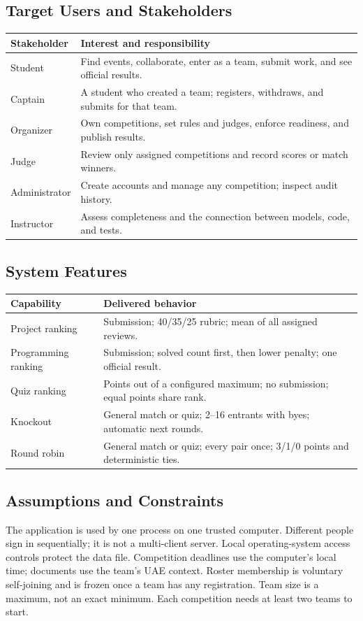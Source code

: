 \documentclass[12pt]{article}
\begin{document}
\subsection{Target Users and Stakeholders}
\begin{tabularx}{\linewidth}{lY}\toprule Stakeholder & Interest and responsibility\\\midrule
Student & Find events, collaborate, enter as a team, submit work, and see official results.\\
Captain & A student who created a team; registers, withdraws, and submits for that team.\\
Organizer & Own competitions, set rules and judges, enforce readiness, and publish results.\\
Judge & Review only assigned competitions and record scores or match winners.\\
Administrator & Create accounts and manage any competition; inspect audit history.\\
Instructor & Assess completeness and the connection between models, code, and tests.\\\bottomrule\end{tabularx}
\subsection{System Features}
\begin{tabularx}{\linewidth}{lY}\toprule Capability & Delivered behavior\\\midrule
Project ranking & Submission; 40/35/25 rubric; mean of all assigned reviews.\\
Programming ranking & Submission; solved count first, then lower penalty; one official result.\\
Quiz ranking & Points out of a configured maximum; no submission; equal points share rank.\\
Knockout & General match or quiz; 2--16 entrants with byes; automatic next rounds.\\
Round robin & General match or quiz; every pair once; 3/1/0 points and deterministic ties.\\\bottomrule\end{tabularx}
\subsection{Assumptions and Constraints}
The application is used by one process on one trusted computer. Different people sign in sequentially; it is not a multi-client server. Local operating-system access controls protect the data file. Competition deadlines use the computer's local time; documents use the team's UAE context. Roster membership is voluntary self-joining and is frozen once a team has any registration. Team size is a maximum, not an exact minimum. Each competition needs at least two teams to start.
\end{document}
